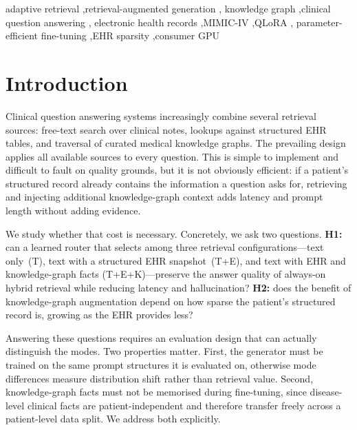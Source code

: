 \documentclass[preprint,12pt]{elsarticle}
\begin{document}
\begin{frontmatter}
\begin{keyword}
adaptive retrieval \sep retrieval-augmented generation \sep
knowledge graph \sep clinical question answering \sep
electronic health records \sep MIMIC-IV \sep QLoRA \sep
parameter-efficient fine-tuning \sep EHR sparsity \sep consumer GPU
\end{keyword}

\end{frontmatter}

\section{Introduction}

Clinical question answering systems increasingly combine several
retrieval sources: free-text search over clinical notes, lookups
against structured EHR tables, and traversal of curated medical
knowledge graphs. The prevailing design applies all available sources
to every question. This is simple to implement and difficult to fault
on quality grounds, but it is not obviously efficient: if a patient's
structured record already contains the information a question asks
for, retrieving and injecting additional knowledge-graph context adds
latency and prompt length without adding evidence.

We study whether that cost is necessary. Concretely, we ask two
questions. \textbf{H1:} can a learned router that selects among three
retrieval configurations---text only~(T), text with a structured EHR
snapshot~(T+E), and text with EHR and knowledge-graph facts
(T+E+K)---preserve the answer quality of always-on hybrid retrieval
while reducing latency and hallucination? \textbf{H2:} does the
benefit of knowledge-graph augmentation depend on how sparse the
patient's structured record is, growing as the EHR provides less?

Answering these questions requires an evaluation design that can
actually distinguish the modes. Two properties matter. First, the
generator must be trained on the same prompt structures it is
evaluated on, otherwise mode differences measure distribution shift
rather than retrieval value. Second, knowledge-graph facts must not
be memorised during fine-tuning, since disease-level clinical facts
are patient-independent and therefore transfer freely across a
patient-level data split. We address both explicitly.
\end{document}
